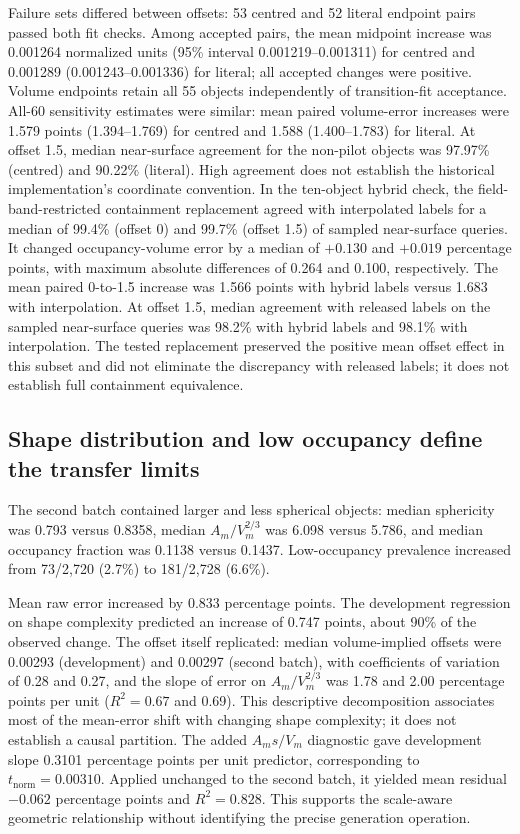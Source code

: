 \documentclass[journal]{IEEEtran}
\begin{document}
Failure sets differed between offsets: 53 centred and 52 literal endpoint pairs passed both fit checks. Among accepted pairs, the mean midpoint increase was 0.001264 normalized units (95\% interval 0.001219--0.001311) for centred and 0.001289 (0.001243--0.001336) for literal; all accepted changes were positive. Volume endpoints retain all 55 objects independently of transition-fit acceptance. All-60 sensitivity estimates were similar: mean paired volume-error increases were 1.579 points (1.394--1.769) for centred and 1.588 (1.400--1.783) for literal. At offset 1.5, median near-surface agreement for the non-pilot objects was 97.97\% (centred) and 90.22\% (literal). High agreement does not establish the historical implementation's coordinate convention. In the ten-object hybrid check, the field-band-restricted containment replacement agreed with interpolated labels for a median of 99.4\% (offset 0) and 99.7\% (offset 1.5) of sampled near-surface queries. It changed occupancy-volume error by a median of $+0.130$ and $+0.019$ percentage points, with maximum absolute differences of 0.264 and 0.100, respectively. The mean paired 0-to-1.5 increase was 1.566 points with hybrid labels versus 1.683 with interpolation. At offset 1.5, median agreement with released labels on the sampled near-surface queries was 98.2\% with hybrid labels and 98.1\% with interpolation. The tested replacement preserved the positive mean offset effect in this subset and did not eliminate the discrepancy with released labels; it does not establish full containment equivalence.


\subsection{Shape distribution and low occupancy define the transfer limits}

The second batch contained larger and less spherical objects: median sphericity was 0.793 versus 0.8358, median $A_m/V_m^{2/3}$ was 6.098 versus 5.786, and median occupancy fraction was 0.1138 versus 0.1437. Low-occupancy prevalence increased from 73/2,720 (2.7\%) to 181/2,728 (6.6\%).

Mean raw error increased by 0.833 percentage points. The development regression on shape complexity predicted an increase of 0.747 points, about 90\% of the observed change. The offset itself replicated: median volume-implied offsets were 0.00293 (development) and 0.00297 (second batch), with coefficients of variation of 0.28 and 0.27, and the slope of error on $A_m/V_m^{2/3}$ was 1.78 and 2.00 percentage points per unit ($R^2=0.67$ and 0.69). This descriptive decomposition associates most of the mean-error shift with changing shape complexity; it does not establish a causal partition. The added $A_ms/V_m$ diagnostic gave development slope 0.3101 percentage points per unit predictor, corresponding to $t_{\mathrm{norm}}=0.00310$. Applied unchanged to the second batch, it yielded mean residual $-0.062$ percentage points and $R^2=0.828$. This supports the scale-aware geometric relationship without identifying the precise generation operation.
\end{document}
